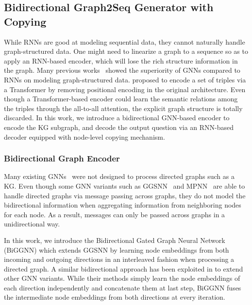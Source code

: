 \documentclass[journal]{IEEEtran}
\begin{document}
\subsection{Bidirectional Graph2Seq Generator with Copying}



While RNNs are good at modeling sequential data, they cannot naturally handle graph-structured data.
One might need to linearize a graph to a sequence so as to apply an RNN-based encoder, which will lose the rich structure information in the graph.
Many previous works~\cite{bastings2017graph,beck2018graph} showed the superiority of GNNs compared to RNNs on modeling graph-structured data. 
\cite{kumar2019difficulty} proposed to encode a set of triples via a Transformer by removing positional encoding in the original architecture.
Even though a Transformer-based encoder could learn the semantic relations among the triples through the all-to-all attention,
the explicit graph structure is totally discarded.
In this work, we introduce a 
bidirectional GNN-based encoder to encode the KG subgraph, and decode the output question via an RNN-based decoder equipped with node-level copying mechanism.





\subsubsection{Bidirectional Graph Encoder}


Many existing GNNs~\cite{kipf2016semi,hamilton2017inductive,velivckovic2017graph} were not designed to process directed graphs such as a KG.
Even though some GNN variants such as GGSNN~\cite{li2015gated} and MPNN~\cite{gilmer2017neural} are able to handle directed graphs via message passing across graphs, 
they do not model the bidirectional information when aggregating information from neighboring nodes for each node.
As a result, messages can only be passed across graphs in a unidirectional way.


In this work, we introduce the Bidirectional Gated Graph Neural Network (BiGGNN) which extends GGSNN
by learning node embeddings from both incoming and outgoing directions in an interleaved fashion when processing a directed graph.
A similar bidirectional approach has been exploited in \cite{xu2018graph2seq,ribeiro2019enhancing} to extend other GNN variants. 
While their methods simply learn the node embeddings of each direction independently and concatenate them at last step,
BiGGNN fuses the intermediate node embeddings from both directions at every iteration.
\end{document}
